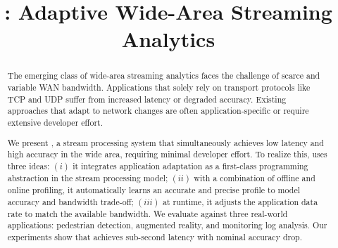 \documentclass[sigplan,10pt,anonymous]{acmart}
\begin{document}


\title{\sysname{}: Adaptive Wide-Area Streaming Analytics}
\gdef\addresses{Paper \textbf{\#200}, 12 pages}

\begin{abstract}
  The emerging class of wide-area streaming analytics faces the challenge of
  scarce and variable WAN bandwidth. Applications that solely rely on
  transport protocols like TCP and UDP suffer from increased latency or degraded
  accuracy. Existing approaches that adapt to network changes are often
  application-specific or require extensive developer effort.

  We present \sysname{}, a stream processing system that simultaneously achieves
  low latency and high accuracy in the wide area, requiring minimal developer
  effort. To realize this, \sysname{} uses three ideas: $(i)$ it integrates
  application adaptation as a first-class programming abstraction in the stream
  processing model; $(ii)$ with a combination of offline and online profiling,
  it automatically learns an accurate and precise profile to model accuracy and
  bandwidth trade-off; $(iii)$ at runtime, it adjusts the application data rate
  to match the available bandwidth. We evaluate \sysname{} against three
  real-world applications: pedestrian detection, augmented reality, and
  monitoring log analysis. Our experiments show that \sysname{} achieves
  sub-second latency with nominal accuracy drop.
\end{abstract}

\maketitle











\def \bibfont {\normalsize}

\end{document}
